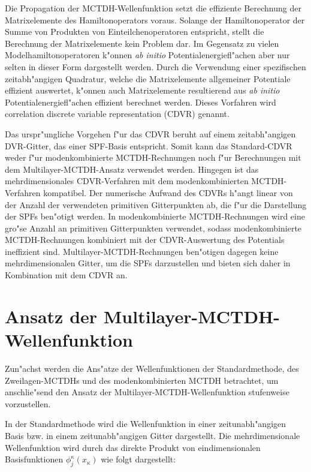Die Propagation der MCTDH-Wellenfunktion setzt die effiziente Berechnung der Matrixelemente des Hamiltonoperators voraus.
Solange der Hamiltonoperator der Summe von Produkten von Einteilchenoperatoren \cite{MMC1} entspricht, stellt die Berechnung der Matrixelemente kein Problem dar.
Im Gegensatz zu vielen Modelhamiltonoperatoren k"onnen \textit{ab initio} Potentialenergiefl"achen aber nur selten in dieser Form dargestellt werden.
Durch die Verwendung einer spezifischen zeitabh"angigen Quadratur, welche die Matrixelemente allgemeiner Potentiale effizient auswertet, k"onnen
auch Matrixelemente resultierend aus \textit{ab initio} Potentialenergiefl"achen effizient berechnet werden.
Dieses Vorfahren wird correlation discrete variable representation (CDVR) \cite{M3, vHM2} genannt.

Das urspr"ungliche Vorgehen f"ur das CDVR \cite{M3} beruht auf einem zeitabh"angigen DVR-Gitter, das einer SPF-Basis entspricht.
Somit kann das Standard-CDVR weder f"ur modenkombinierte MCTDH-Rechnungen noch f"ur Berechnungen mit dem Multilayer-MCTDH-Ansatz verwendet werden.
Hingegen ist das mehrdimensionales CDVR-Verfahren mit dem modenkombinierten MCTDH-Verfahren kompatibel. \cite{vHM3}
Der numerische Aufwand des CDVRs h"angt linear von der Anzahl der verwendeten primitiven Gitterpunkten ab, die f"ur die Darstellung der SPFs ben"otigt werden.
In modenkombinierte MCTDH-Rechnungen wird eine gro"se Anzahl an primitiven Gitterpunkten verwendet, sodass modenkombinierte MCTDH-Rechnungen kombiniert mit der 
CDVR-Auswertung des Potentials ineffizient sind. Multilayer-MCTDH-Rechnungen ben"otigen dagegen keine mehrdimensionalen Gitter, um die SPFs darzustellen und bieten sich
daher in Kombination mit dem CDVR an.


\section{Ansatz der Multilayer-MCTDH-Wellenfunktion}
Zun"achst  werden die Ans"atze der Wellenfunktionen der Standardmethode, des Zweilagen-MCTDHs und des moden\-kombi\-nierten MCTDH betrachtet,
 um anschlie"send den Ansatz der Multi\-layer-MCTDH-Wellenfunktion
stufenweise vorzustellen.

In der Standardmethode wird die Wellenfunktion in einer zeitunabh"angigen Basis bzw. in einem zeitunabh"angigen Gitter dargestellt.
Die mehrdimensionale Wellenfunktion wird durch das direkte Produkt von eindimensionalen Basisfunktionen $\phi^{\kappa}_{j}(x_{\kappa})$ wie folgt 
dargestellt:

